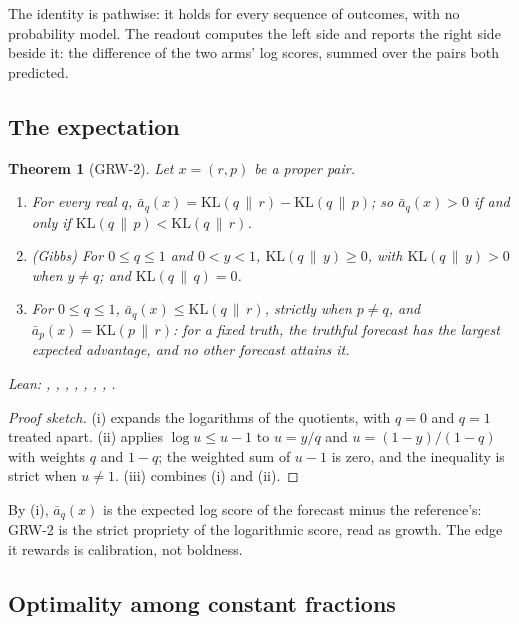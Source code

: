 \documentclass[11pt]{article}
\theoremstyle{plain}
\newtheorem{theorem}{Theorem}[section]
\theoremstyle{definition}
\theoremstyle{remark}
\newenvironment{leannames}{\par\smallskip\small\raggedright\upshape\noindent Lean: }{\par}
\newcommand{\KL}[2]{\mathrm{KL}(#1\,\|\,#2)}
\newcommand{\abar}{\bar a}
\begin{document}
The identity is pathwise: it holds for every sequence of outcomes, with no probability model. The
readout computes the left side and reports the right side beside it: the difference of the two
arms' log scores, summed over the pairs both predicted.

\subsection{The expectation}

\begin{theorem}[GRW-2]
\label{thm:grw2}
Let $x=(r,p)$ be a proper pair.
\begin{enumerate}
  \item[(i)] For every real $q$, $\abar_q(x)=\KL{q}{r}-\KL{q}{p}$; so $\abar_q(x)>0$ if and only if
    $\KL{q}{p}<\KL{q}{r}$.
  \item[(ii)] (Gibbs) For $0\le q\le1$ and $0<y<1$, $\KL{q}{y}\ge0$, with $\KL{q}{y}>0$ when
    $y\ne q$; and $\KL{q}{q}=0$.
  \item[(iii)] For $0\le q\le1$, $\abar_q(x)\le\KL{q}{r}$, strictly when $p\ne q$, and
    $\abar_p(x)=\KL{p}{r}$: for a fixed truth, the truthful forecast has the largest expected
    advantage, and no other forecast attains it.
\end{enumerate}
\begin{leannames}
, , ,
, , , ,
.
\end{leannames}
\end{theorem}

\begin{proof}[Proof sketch]
(i) expands the logarithms of the quotients, with $q=0$ and $q=1$ treated apart. (ii) applies
$\log u\le u-1$ to $u=y/q$ and $u=(1-y)/(1-q)$ with weights $q$ and $1-q$; the weighted sum of
$u-1$ is zero, and the inequality is strict when $u\ne1$. (iii) combines (i) and (ii).
\end{proof}

By (i), $\abar_q(x)$ is the expected log score of the forecast minus the reference's: GRW-2 is the
strict propriety of the logarithmic score, read as growth. The edge it rewards is calibration, not
boldness.

\subsection{Optimality among constant fractions}
\end{document}

